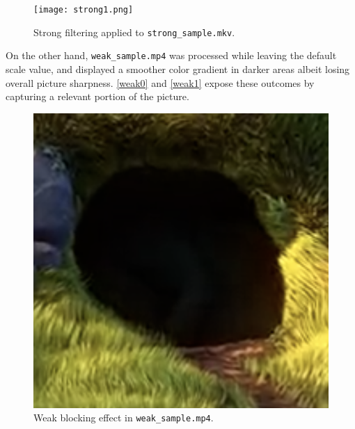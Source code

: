 \documentclass{article}
\begin{document}
\begin{figure}[!htbp]
  \centering
  \texttt{[image: strong1.png]}
  \caption{Strong filtering applied to \texttt{strong\_sample.mkv}.}
  \label{strong1}
\end{figure}

On the other hand, \texttt{weak\_sample.mp4} was processed while leaving the default scale value, and displayed a smoother color gradient in darker areas albeit losing overall picture sharpness. \autoref{weak0} and \autoref{weak1} expose these outcomes by capturing a relevant portion of the picture.

\begin{figure}[!htbp]
  \centering
  \includegraphics[width=\textwidth]{weak0.png}
  \caption{Weak blocking effect in \texttt{weak\_sample.mp4}.}
  \label{weak0}
\end{figure}
\end{document}
